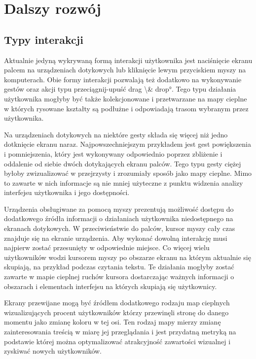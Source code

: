 \section{Dalszy rozwój}
\label{sec:future_work}

\subsection{Typy interakcji}
Aktualnie jedyną wykrywaną formą interakcji użytkownika jest naciśnięcie ekranu palcem na urządzeniach dotykowych lub kliknięcie lewym przyciskiem myszy na komputerach. Obie formy interakcji pozwalają też dodatkowo na wykonywanie gestów oraz akcji typu przeciągnij-upuść \ang{drag \& drop}. Tego typu działania użytkownika mogłyby być także kolekcjonowane i przetwarzane na mapy cieplne w których rysowane kształty są podłużne i odpowiadają trasom wybranym przez użytkownika.

Na urządzeniach dotykowych na niektóre gesty składa się więcej niż jedno dotknięcie ekranu naraz. Najpowszechniejszym przykładem jest gest powiększenia i pomniejszenia, który jest wykonywany odpowiednio poprzez zbliżenie i oddalenie od siebie dwóch dotykających ekranu palców. Tego typu gesty ciężej byłoby zwizualizować w przejrzysty i zrozumiały sposób jako mapy cieplne. Mimo to zawarte w nich informacje są nie mniej użyteczne z punktu widzenia analizy interfejsu użytkownika i jego dostępności.

Urządzenia obsługiwane za pomocą myszy prezentują możliwość dostępu do dodatkowego źródła informacji o działaniach użytkownika niedostępnego na ekranach dotykowych. W przeciwieństwie do palców, kursor myszy cały czas znajduje się na ekranie urządzenia. Aby wykonać dowolną interakcję musi najpierw zostać przesunięty w odpowiednie miejsce. Co więcej wielu użytkowników wodzi kursorem myszy po obszarze ekranu na którym aktualnie się skupiają, na przykład podczas czytania tekstu. Te działania mogłyby zostać zawarte w mapie cieplnej ruchów kursora dostarczając ważnych informacji o obszarach i elementach interfejsu na których skupiają się użytkownicy.

Ekrany przewijane mogą być źródłem dodatkowego rodzaju map cieplnych wizualizujących procent użytkowników którzy przewinęli stronę do danego momentu jako zmianę koloru w tej osi. Ten rodzaj mapy mierzy zmianę zainteresowania treścią w miarę jej przeglądania i jest przydatną metryką na podstawie której można optymalizować atrakcyjność zawartości wizualnej i zyskiwać nowych użytkowników.

